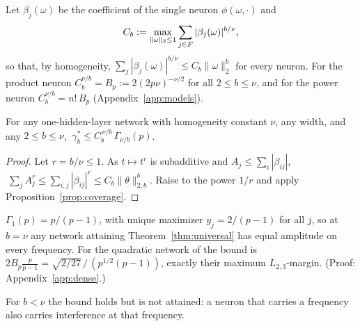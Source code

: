 Let $\beta_j(\omega)$ be the coefficient of the single neuron $\phi(\omega,\cdot)$ and
\[
C_b:=\max_{\|\omega\|_2\le1}\sum_{j\in F}|\beta_j(\omega)|^{b/\nu},
\]
so that, by homogeneity, $\sum_j|\beta_j(\omega)|^{b/\nu}\le C_b\|\omega\|_2^b$ for every neuron. For the product neuron $C_b^{\nu/b}=B_p:=2(2p\nu)^{-\nu/2}$ for all $2\le b\le\nu$, and for the power neuron $C_b^{\nu/b}=n!\,B_p$ (Appendix~\ref{app:models}).

\begin{theorem}\label{thm:universal}
For any one-hidden-layer network with homogeneity constant $\nu$, any width, and any $2\le b\le\nu$, $\ \gamma^*_b\le C_b^{\,\nu/b}\,\Gamma_{\nu/b}(p)$.
\end{theorem}
\begin{proof}
Let $r=b/\nu\le1$. As $t\mapsto t^r$ is subadditive and $A_j\le\sum_i|\beta_{ij}|$, $\ \sum_jA_j^r\le\sum_{i,j}|\beta_{ij}|^r\le C_b\|\theta\|_{2,b}^b$. Raise to the power $1/r$ and apply Proposition~\ref{prop:coverage}.
\end{proof}

\begin{corollary}[$b=\nu$: every frequency is used]\label{cor:dense}
$\Gamma_1(p)=p/(p-1)$, with unique maximizer $y_j=2/(p-1)$ for all $j$, so at $b=\nu$ any network attaining Theorem~\ref{thm:universal} has equal amplitude on every frequency. For the quadratic network of \citet{morwani2024feature} the bound is $2B_p\frac p{p-1}=\sqrt{2/27}\,/\,(p^{1/2}(p-1))$, exactly their maximum $L_{2,3}$-margin. (Proof: Appendix~\ref{app:dense}.)
\end{corollary}

For $b<\nu$ the bound holds but is not attained: a neuron that carries a frequency also carries interference at that frequency.
